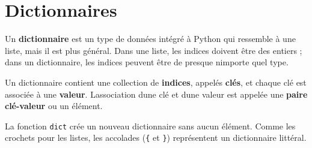 \hypertarget{dictionnaires}{%
\section{Dictionnaires}\label{dictionnaires}}

Un \textbf{dictionnaire} est un type de données intégré à Python qui
ressemble à une liste, mais il est plus général. Dans une liste, les
indices doivent être des entiers ; dans un dictionnaire, les indices
peuvent être de presque n\textquotesingle importe quel type.

Un dictionnaire contient une collection de \textbf{indices}, appelés
\textbf{clés}, et chaque clé est associée à une \textbf{valeur}.
L\textquotesingle association d\textquotesingle une clé et
d\textquotesingle une valeur est appelée une \textbf{paire clé-valeur}
ou un élément.

La fonction \texttt{dict} crée un nouveau dictionnaire sans aucun
élément. Comme les crochets pour les listes, les accolades (\texttt{\{}
et \texttt{\}}) représentent un dictionnaire littéral.

\begin{Shaded}
\begin{Highlighting}[]
\OperatorTok{\textgreater{}\textgreater{}\textgreater{}}\OperatorTok{=} \NormalTok{()}
\OperatorTok{\textgreater{}\textgreater{}\textgreater{}}
\NormalTok{\{\}}
\OperatorTok{\textgreater{}\textgreater{}\textgreater{}}\OperatorTok{=}\NormalTok{ \{}\NormalTok{: }\NormalTok{, }\NormalTok{: }\NormalTok{, }\NormalTok{: }\NormalTok{\}}
\OperatorTok{\textgreater{}\textgreater{}\textgreater{}}
\NormalTok{\{}\NormalTok{: }\NormalTok{, }\NormalTok{: }\NormalTok{, }\NormalTok{: }\NormalTok{\}}
\end{Highlighting}
\end{Shaded}

